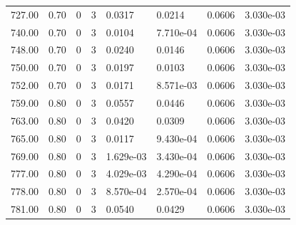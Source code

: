 \documentclass[preview]{standalone}
\begin{document}
{{{{{\begin{tabular}{L{1.2cm}C{1.2cm} C{0.3cm}C{0.5cm} C{1.4cm}C{1.4cm} C{1.4cm}C{1.4cm}}
  727.00  &  0.70  & 0     &  3 &  0.0317  & 0.0214  & 0.0606 &  3.030e-03   \\ 
  740.00  &  0.70  & 0     &  3 &  0.0104  & 7.710e-04  & 0.0606 &  3.030e-03   \\ 
  748.00  &  0.70  & 0     &  3 &  0.0240  & 0.0146  & 0.0606 &  3.030e-03   \\ 
  750.00  &  0.70  & 0     &  3 &  0.0197  & 0.0103  & 0.0606 &  3.030e-03   \\ 
  752.00  &  0.70  & 0     &  3 &  0.0171  & 8.571e-03  & 0.0606 &  3.030e-03   \\ 
  759.00  &  0.80  & 0     &  3 &  0.0557  & 0.0446  & 0.0606 &  3.030e-03   \\ 
  763.00  &  0.80  & 0     &  3 &  0.0420  & 0.0309  & 0.0606 &  3.030e-03   \\ 
  765.00  &  0.80  & 0     &  3 &  0.0117  & 9.430e-04  & 0.0606 &  3.030e-03   \\ 
  769.00  &  0.80  & 0     &  3 &  1.629e-03  & 3.430e-04  & 0.0606 &  3.030e-03   \\ 
  777.00  &  0.80  & 0     &  3 &  4.029e-03  & 4.290e-04  & 0.0606 &  3.030e-03   \\ 
  778.00  &  0.80  & 0     &  3 &  8.570e-04  & 2.570e-04  & 0.0606 &  3.030e-03   \\ 
  781.00  &  0.80  & 0     &  3 &  0.0540  & 0.0429  & 0.0606 &  3.030e-03   \\ 
\hline 
\end{tabular} 

}}}}}
\end{document}
